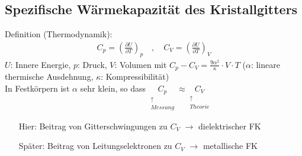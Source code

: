\subsection{Spezifische Wärmekapazität des Kristallgitters} \label{kap:4_6}

Definition (Thermodynamik):
\begin{align*}
	C_p = \left( \frac{\partial U}{\partial T} \right)_p \quad , \quad C_V = \left( \frac{\partial U}{\partial T} \right)_V
\end{align*}
$U$: Innere Energie, $p$: Druck, $V$: Volumen mit $C_p - C_V = \frac{9 \alpha^2}{\kappa} \cdot V \cdot T$ ($\alpha$: lineare thermische Ausdehnung, $\kappa$: Kompressibilität)\\
In Festkörpern ist $\alpha$ sehr klein, so dass $\underset{\begin{matrix}
	\uparrow\\
	Messung
\end{matrix}}{C_p} \approx \underset{\begin{matrix}
	\uparrow\\
	Theorie
\end{matrix}}{C_V}$\\
\begin{itemize}
	\item[Hier:] Beitrag von Gitterschwingungen zu $C_V$ $\rightarrow$ dielektrischer FK
	\item[Später:] Beitrag von Leitungselektronen zu $C_V$ $\rightarrow$ metallische FK 
\end{itemize}

